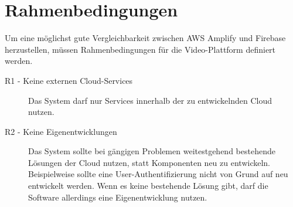 \section{Rahmenbedingungen}

Um eine möglichst gute Vergleichbarkeit zwischen AWS Amplify und Firebase herzustellen, müssen Rahmenbedingungen für die Video-Plattform definiert werden.

\begin{description}
   \item[R1 - Keine externen Cloud-Services] Das System darf nur Services innerhalb der zu entwickelnden Cloud nutzen.
   \item[R2 - Keine Eigenentwicklungen] Das System sollte bei gängigen Problemen weitestgehend bestehende Lösungen der Cloud nutzen, statt Komponenten neu zu entwickeln. Beispielweise sollte eine User-Authentifizierung nicht von Grund auf neu entwickelt werden. Wenn es keine bestehende Lösung gibt, darf die Software allerdings eine Eigenentwicklung nutzen.
\end{description}